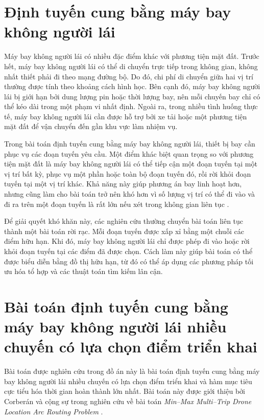 \section{Định tuyến cung bằng máy bay không người lái}

Máy bay không người lái có nhiều đặc điểm khác với phương tiện mặt đất. Trước hết, máy bay không người lái có thể di chuyển trực tiếp trong không gian, không nhất thiết phải đi theo mạng đường bộ. Do đó, chi phí di chuyển giữa hai vị trí thường được tính theo khoảng cách hình học. Bên cạnh đó, máy bay không người lái bị giới hạn bởi dung lượng pin hoặc thời lượng bay, nên mỗi chuyến bay chỉ có thể kéo dài trong một phạm vi nhất định. Ngoài ra, trong nhiều tình huống thực tế, máy bay không người lái cần được hỗ trợ bởi xe tải hoặc một phương tiện mặt đất để vận chuyển đến gần khu vực làm nhiệm vụ.

Trong bài toán định tuyến cung bằng máy bay không người lái, thiết bị bay cần phục vụ các đoạn tuyến yêu cầu. Một điểm khác biệt quan trọng so với phương tiện mặt đất là máy bay không người lái có thể tiếp cận một đoạn tuyến tại một vị trí bất kỳ, phục vụ một phần hoặc toàn bộ đoạn tuyến đó, rồi rời khỏi đoạn tuyến tại một vị trí khác. Khả năng này giúp phương án bay linh hoạt hơn, nhưng cũng làm cho bài toán trở nên khó hơn vì số lượng vị trí có thể đi vào và đi ra trên một đoạn tuyến là rất lớn nếu xét trong không gian liên tục \cite{campbell2018darp}.

Để giải quyết khó khăn này, các nghiên cứu thường chuyển bài toán liên tục thành một bài toán rời rạc. Mỗi đoạn tuyến được xấp xỉ bằng một chuỗi các điểm hữu hạn. Khi đó, máy bay không người lái chỉ được phép đi vào hoặc rời khỏi đoạn tuyến tại các điểm đã được chọn. Cách làm này giúp bài toán có thể được biểu diễn bằng đồ thị hữu hạn, từ đó có thể áp dụng các phương pháp tối ưu hóa tổ hợp và các thuật toán tìm kiếm lân cận.

\section{Bài toán định tuyến cung bằng máy bay không người lái nhiều chuyến có lựa chọn điểm triển khai}

Bài toán được nghiên cứu trong đồ án này là bài toán định tuyến cung bằng máy bay không người lái nhiều chuyến có lựa chọn điểm triển khai và hàm mục tiêu cực tiểu hóa thời gian hoàn thành lớn nhất. Bài toán này được giới thiệu bởi Corberán và cộng sự trong nghiên cứu về bài toán \textit{Min--Max Multi--Trip Drone Location Arc Routing Problem} \cite{corberan2025mmdlarp}.


